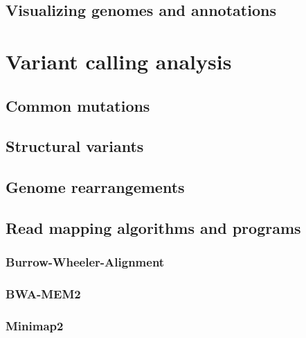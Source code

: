 \documentclass[
  letterpaper,
  DIV=11,
  numbers=noendperiod,
  oneside]{scrreprt}
\begin{document}
\hypertarget{visualizing-genomes-and-annotations}{%
\section{Visualizing genomes and
annotations}\label{visualizing-genomes-and-annotations}}

\hypertarget{sec-variant-calling}{%
\chapter{Variant calling analysis}\label{sec-variant-calling}}

\hypertarget{common-mutations}{%
\section{Common mutations}\label{common-mutations}}

\hypertarget{structural-variants}{%
\section{Structural variants}\label{structural-variants}}

\hypertarget{genome-rearrangements}{%
\section{Genome rearrangements}\label{genome-rearrangements}}

\hypertarget{read-mapping-algorithms-and-programs}{%
\section{Read mapping algorithms and
programs}\label{read-mapping-algorithms-and-programs}}

\hypertarget{burrow-wheeler-alignment}{%
\subsection{Burrow-Wheeler-Alignment}\label{burrow-wheeler-alignment}}

\hypertarget{bwa-mem2}{%
\subsection{BWA-MEM2}\label{bwa-mem2}}

\hypertarget{minimap2}{%
\subsection{Minimap2}\label{minimap2}}
\end{document}
